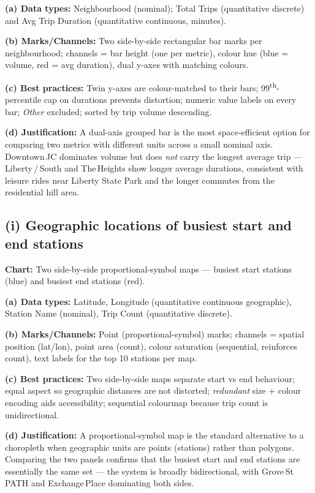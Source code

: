 \documentclass[11pt, a4paper]{article}
\begin{document}
\textbf{(a) Data types:} Neighbourhood (nominal); Total Trips (quantitative discrete) and Avg Trip Duration (quantitative continuous, minutes).

\textbf{(b) Marks/Channels:} Two side-by-side rectangular bar marks per neighbourhood; channels = bar height (one per metric), colour hue (blue = volume, red = avg duration), dual y-axes with matching colours.

\textbf{(c) Best practices:} Twin y-axes are colour-matched to their bars; 99\textsuperscript{th}-percentile cap on durations prevents distortion; numeric value labels on every bar; \emph{Other} excluded; sorted by trip volume descending.

\textbf{(d) Justification:} A dual-axis grouped bar is the most space-efficient option for comparing two metrics with different units across a small nominal axis. Downtown\,JC dominates volume but does \emph{not} carry the longest average trip --- Liberty\,/\,South and The\,Heights show longer average durations, consistent with leisure rides near Liberty State Park and the longer commutes from the residential hill area.


\subsection{(i) Geographic locations of busiest start and end stations}
\textbf{Chart:} Two side-by-side proportional-symbol maps --- busiest start stations (blue) and busiest end stations (red).

\textbf{(a) Data types:} Latitude, Longitude (quantitative continuous geographic), Station Name (nominal), Trip Count (quantitative discrete).

\textbf{(b) Marks/Channels:} Point (proportional-symbol) marks; channels = spatial position (lat/lon), point area (count), colour saturation (sequential, reinforces count), text labels for the top 10 stations per map.

\textbf{(c) Best practices:} Two side-by-side maps separate start vs end behaviour; equal aspect so geographic distances are not distorted; \emph{redundant} size + colour encoding aids accessibility; sequential colourmap because trip count is unidirectional.

\textbf{(d) Justification:} A proportional-symbol map is the standard alternative to a choropleth when geographic units are points (stations) rather than polygons. Comparing the two panels confirms that the busiest start and end stations are essentially the same set --- the system is broadly bidirectional, with Grove\,St\,PATH and Exchange\,Place dominating both sides.
\end{document}
